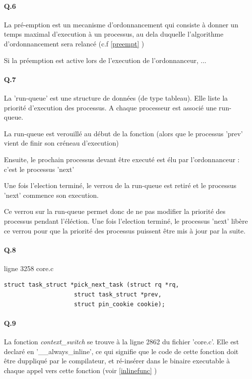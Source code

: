 \documentclass[10pt]{article}
\begin{document}
\paragraph{Q.6}
La pré-emption est un mecanisme d'ordonnancement qui consiste à donner un temps maximal d'execution à un processus,
au dela duquelle l'algorithme d'ordonnancement sera relancé (c.f \ref{preempt} )

Si la préemption est active lors de l'execution de l'ordonnanceur, ...
 
 \paragraph{Q.7}
 La 'run-queue' est une structure de données (de type tableau). Elle liste la priorité d'execution des processus.
 A chaque processeur est associé une run-queue.
 
 La run-queue est verouillé au début de la fonction  (alors que le processus 'prev' vient de finir son créneau d'execution)
 
 Ensuite, le prochain processus devant être executé est élu par l'ordonnanceur : c'est le processus 'next'
 
 Une fois l'election terminé, le verrou de la run-queue est retiré et le processus 'next' commence son execution.
 
 Ce verrou sur la run-queue permet donc de ne pas modifier la priorité des processus pendant l'éléction.
 Une fois l'election terminé, le processus 'next' libère ce verrou pour que la priorité des processus puissent être mis à jour par la suite.
 
\paragraph{Q.8} ligne 3258 core.c
\lstset{language=C}
\begin{lstlisting}[frame=single]
struct task_struct *pick_next_task (struct rq *rq,
				    struct task_struct *prev,
				    struct pin_cookie cookie);
\end{lstlisting}
 
 \paragraph{Q.9}
 La fonction \textit{context_switch} se trouve à la ligne 2862 du fichier 'core.c'.
 Elle est declaré en '__always_inline', ce qui signifie que le code de cette fonction doit être duppliqué par le compilateur,
 et ré-insérer dans le binaire executable à chaque appel vers cette fonction (voir \ref{inlinefunc} )
 
\end{document}
